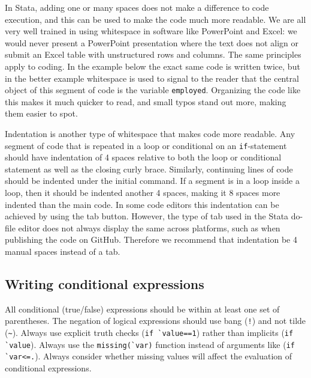 In Stata, adding one or many spaces does not make a difference to code execution,
and this can be used to make the code much more readable.
We are all very well trained in using whitespace in software like PowerPoint and Excel:
we would never present a PowerPoint presentation where the text does not align
or submit an Excel table with unstructured rows and columns.
The same principles apply to coding.
In the example below the exact same code is written twice,
but in the better example whitespace is used to signal to the reader
that the central object of this segment of code is the variable \texttt{employed}.
Organizing the code like this makes it much quicker to read,
and small typos stand out more, making them easier to spot.


\noindent Indentation is another type of whitespace that makes code more readable.
Any segment of code that is repeated in a loop or conditional on an
\texttt{if}-statement should have indentation of 4 spaces relative
to both the loop or conditional statement as well as the closing curly brace.
Similarly, continuing lines of code should be indented under the initial command.
If a segment is in a loop inside a loop, then it should be indented another 4 spaces,
making it 8 spaces more indented than the main code.
In some code editors this indentation can be achieved by using the tab button.
However, the type of tab used in the Stata do-file editor does not always display the same across platforms,
such as when publishing the code on GitHub.
Therefore we recommend that indentation be 4 manual spaces instead of a tab.


\subsection{Writing conditional expressions}

All conditional (true/false) expressions should be within at least one set of parentheses.
The negation of logical expressions should use bang (\texttt{!}) and not tilde (\texttt{\~}).
Always use explicit truth checks (\texttt{if \`{}value\textquotesingle==1})
rather than implicits (\texttt{if \`{}value\textquotesingle}).
Always use the \texttt{missing(\`{}var\textquotesingle)} function
instead of arguments like (\texttt{if \`{}var\textquotesingle<=.}).
Always consider whether missing values will affect the evaluation of conditional expressions.

